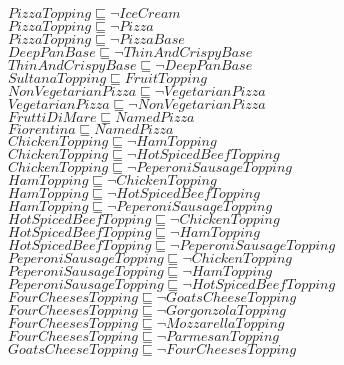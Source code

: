 \documentclass[a4paper,10pt]{article}
\begin{document}
 $PizzaTopping \sqsubseteq  \lnot IceCream$\\ 
 $PizzaTopping \sqsubseteq  \lnot Pizza$\\ 
 $PizzaTopping \sqsubseteq  \lnot PizzaBase$\\ 
 $DeepPanBase \sqsubseteq  \lnot ThinAndCrispyBase$\\ 
 $ThinAndCrispyBase \sqsubseteq  \lnot DeepPanBase$\\ 
 $SultanaTopping \sqsubseteq FruitTopping$\\ 
 $NonVegetarianPizza \sqsubseteq  \lnot VegetarianPizza$\\ 
 $VegetarianPizza \sqsubseteq  \lnot NonVegetarianPizza$\\ 
 $FruttiDiMare \sqsubseteq NamedPizza$\\ 
 $Fiorentina \sqsubseteq NamedPizza$\\ 
 $ChickenTopping \sqsubseteq  \lnot HamTopping$\\ 
 $ChickenTopping \sqsubseteq  \lnot HotSpicedBeefTopping$\\ 
 $ChickenTopping \sqsubseteq  \lnot PeperoniSausageTopping$\\ 
 $HamTopping \sqsubseteq  \lnot ChickenTopping$\\ 
 $HamTopping \sqsubseteq  \lnot HotSpicedBeefTopping$\\ 
 $HamTopping \sqsubseteq  \lnot PeperoniSausageTopping$\\ 
 $HotSpicedBeefTopping \sqsubseteq  \lnot ChickenTopping$\\ 
 $HotSpicedBeefTopping \sqsubseteq  \lnot HamTopping$\\ 
 $HotSpicedBeefTopping \sqsubseteq  \lnot PeperoniSausageTopping$\\ 
 $PeperoniSausageTopping \sqsubseteq  \lnot ChickenTopping$\\ 
 $PeperoniSausageTopping \sqsubseteq  \lnot HamTopping$\\ 
 $PeperoniSausageTopping \sqsubseteq  \lnot HotSpicedBeefTopping$\\ 
 $FourCheesesTopping \sqsubseteq  \lnot GoatsCheeseTopping$\\ 
 $FourCheesesTopping \sqsubseteq  \lnot GorgonzolaTopping$\\ 
 $FourCheesesTopping \sqsubseteq  \lnot MozzarellaTopping$\\ 
 $FourCheesesTopping \sqsubseteq  \lnot ParmesanTopping$\\ 
 $GoatsCheeseTopping \sqsubseteq  \lnot FourCheesesTopping$\\ 
\end{document}
